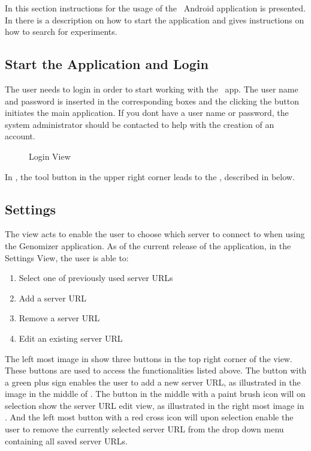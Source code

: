 In this section instructions for the usage of the \appName\ Android application is presented. In  there is a description on how to start the application and  gives instructions on how to search for experiments.

\subsection{Start the Application and Login}
\label{sec:and_start}


The user needs to login in order to start working with the \appName\ app. The  user name and password is inserted in the corresponding boxes and the clicking the  button initiates the main application. If you dont have a user name or password, the system administrator should be contacted to help with the creation of an account.

\begin{figure}[h]
\caption{Login View}
\label{fig:and_login_man}
\end{figure}
\FloatBarrier


In , the tool button in the upper right corner leads to the , described in   below.

\subsection{Settings}\label{sec:and_manual_settings}
The  view acts to enable the user to choose which server to connect to when using the Genomizer application. As of the current release of the application, in the Settings View, the user is able to:

\begin{enumerate}
\item Select one of previously used server URLs
\item Add a server URL
\item Remove a server URL
\item Edit an existing server URL
\end{enumerate}

The left most image in  show three buttons in the top right corner of the view. These buttons are used to access the functionalities listed above. The button with a green plus sign enables the user to add a new server URL, as illustrated in the image in the middle of . The button in the middle with a paint brush icon will on selection show the server URL edit view, as illustrated in the right most image in . And the left most button with a red cross icon will upon selection enable the user to remove the currently selected server URL from the drop down menu containing all saved server URLs.


